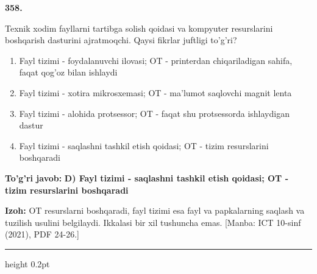 \documentclass[10pt,a4paper]{article}
\begin{document}
{\bfseries\sffamily\color{ink} 358.}
\par
Texnik xodim fayllarni tartibga solish qoidasi va kompyuter resurslarini boshqarish dasturini ajratmoqchi. Qaysi fikrlar juftligi to'g'ri?
\begin{enumerate}[label=\Alph*),leftmargin=9mm]
\item Fayl tizimi - foydalanuvchi ilovasi; OT - printerdan chiqariladigan sahifa, faqat qog'oz bilan ishlaydi
\item Fayl tizimi - xotira mikrosxemasi; OT - ma'lumot saqlovchi magnit lenta
\item Fayl tizimi - alohida protsessor; OT - faqat shu protsessorda ishlaydigan dastur
\item Fayl tizimi - saqlashni tashkil etish qoidasi; OT - tizim resurslarini boshqaradi
\end{enumerate}
\begin{tcolorbox}[enhanced,breakable,colback=teal!4,colframe=teal!60!black,boxrule=0.45pt,arc=1.2mm,left=2.7mm,right=2.7mm,top=1.8mm,bottom=1.8mm,before skip=2mm,after skip=2mm]
{\bfseries\sffamily\color{teal}To'g'ri javob:} \textbf{D) Fayl tizimi - saqlashni tashkil etish qoidasi; OT - tizim resurslarini boshqaradi}
\par\smallskip
{\bfseries Izoh:} OT resurslarni boshqaradi, fayl tizimi esa fayl va papkalarning saqlash va tuzilish usulini belgilaydi. Ikkalasi bir xil tushuncha emas. [Manba: ICT 10-sinf (2021), PDF 24-26.]
\end{tcolorbox}
\vspace{2mm}\hrule height 0.2pt\vspace{3mm}
\end{document}
